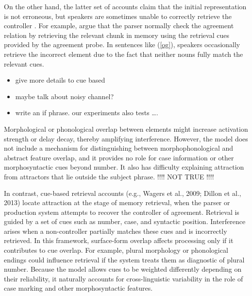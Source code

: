 \documentclass[
  authoryear,
  3p]{elsarticle}
\providecommand{\tightlist}{%
  \setlength{\itemsep}{0pt}\setlength{\parskip}{0pt}}
\begin{document}
On the other hand, the latter set of accounts claim that the initial
representation is not erroneous, but speakers are sometimes unable to
correctly retrieve the controller \citep{WagersEtAl:2009, Dillon2013a}.
For example, \citet{WagersEtAl:2009} argue that the parser normally
check the agreement relation by retrieving the relevant chunk in memory
using the retrieval cues provided by the agreement probe. In sentences
like (\ref{og}), speakers occasionally retrieve the incorrect element
due to the fact that neither nouns fully match the relevant cues.

\begin{itemize}
\tightlist
\item
  give more details to cue based
\item
  maybe talk about noisy channel?
\item
  write an if phrase. our experiments also tests \ldots.
\end{itemize}

Morphological or phonological overlap between elements might increase
activation strength or delay decay, thereby amplifying interference.
However, the model does not include a mechanism for distinguishing
between morphophonological and abstract feature overlap, and it provides
no role for case information or other morphosyntactic cues beyond
number. It also has difficulty explaining attraction from attractors
that lie outside the subject phrase. !!!! NOT TRUE !!!!

In contrast, cue-based retrieval accounts (e.g., Wagers et al., 2009;
Dillon et al., 2013) locate attraction at the stage of memory retrieval,
when the parser or production system attempts to recover the controller
of agreement. Retrieval is guided by a set of cues such as number, case,
and syntactic position. Interference arises when a non-controller
partially matches these cues and is incorrectly retrieved. In this
framework, surface-form overlap affects processing only if it
contributes to cue overlap. For example, plural morphology or
phonological endings could influence retrieval if the system treats them
as diagnostic of plural number. Because the model allows cues to be
weighted differently depending on their reliability, it naturally
accounts for cross-linguistic variability in the role of case marking
and other morphosyntactic features.
\end{document}
